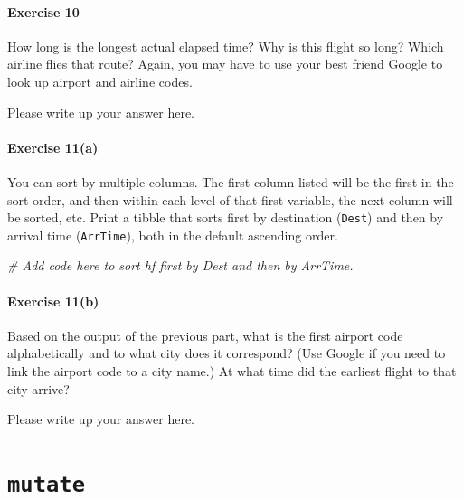 \documentclass[
]{book}
\newenvironment{Shaded}{\begin{snugshade}}{\end{snugshade}}
\newcommand{\CommentTok}[1]{\textcolor[rgb]{0.56,0.35,0.01}{\textit{#1}}}
\begin{document}
\hypertarget{exercise-10-1}{%
\paragraph*{Exercise 10}\label{exercise-10-1}}

How long is the longest actual elapsed time? Why is this flight so long? Which airline flies that route? Again, you may have to use your best friend Google to look up airport and airline codes.

Please write up your answer here.

\hypertarget{exercise-11a}{%
\paragraph*{Exercise 11(a)}\label{exercise-11a}}

You can sort by multiple columns. The first column listed will be the first in the sort order, and then within each level of that first variable, the next column will be sorted, etc. Print a tibble that sorts first by destination (\texttt{Dest}) and then by arrival time (\texttt{ArrTime}), both in the default ascending order.

\begin{Shaded}
\begin{Highlighting}[]
\CommentTok{\# Add code here to sort hf first by Dest and then by ArrTime.}
\end{Highlighting}
\end{Shaded}

\hypertarget{exercise-11b}{%
\paragraph*{Exercise 11(b)}\label{exercise-11b}}

Based on the output of the previous part, what is the first airport code alphabetically and to what city does it correspond? (Use Google if you need to link the airport code to a city name.) At what time did the earliest flight to that city arrive?

Please write up your answer here.

\hypertarget{manipulating-mutate}{%
\section{\texorpdfstring{\texttt{mutate}}{mutate}}\label{manipulating-mutate}}
\end{document}
